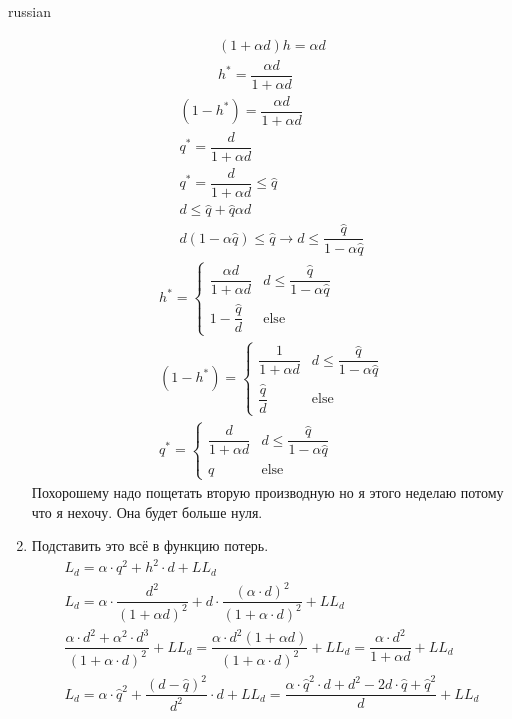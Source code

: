 \documentclass{article}
\begin{document}
\begin{otherlanguage*}{russian}
\begin{enumerate}
\begin{align*}
(1 + \alpha d) h = \alpha d \\
h^* = \dfrac{\alpha d}{1 + \alpha d}
\end{align*}
\begin{align*}
(1 - h^*) = \dfrac{\alpha d}{1 + \alpha d} \\
q^* = \dfrac{d}{1 + \alpha d } \\
q^* = \dfrac{d}{1 + \alpha d} \le \hat q \\
d \le \hat q + \hat q \alpha d \\
d (1 - \alpha \hat q) \le \hat q \rightarrow  d \le \dfrac{\hat q }{1 - \alpha \hat q }
\end{align*}
\begin{align*}
h^* = \begin{cases} 
\dfrac{\alpha d}{1 + \alpha d} & d \le \dfrac{\hat q }{1 - \alpha \hat q} \\ 
1 - \dfrac{\hat q}{d}& \text{else} 
\end{cases}  \\
(1 - h^*) = \begin{cases}
\dfrac{1 }{1 + \alpha d} & d \le \dfrac{\hat q }{1 - \alpha \hat q} \\
\dfrac{ \hat q }{d}& \text{else}
\end{cases} \\
q^* = \begin{cases}
\dfrac{d}{1 + \alpha d } & d \le \dfrac{\hat q }{1 - \alpha \hat q} \\
\hat q & \text{else} 
\end{cases}
\end{align*}
Похорошему надо пощетать вторую производную но я этого неделаю потому что я нехочу. Она будет больше нуля. 
\item Подставить это всё в функцию потерь. 
\begin{align*}
L_d = \alpha \cdot q^2 + h ^2 \cdot d + LL_d \\
L_d = \alpha \cdot \dfrac{d^2}{(1 + \alpha d)^2} + d \cdot \dfrac{(\alpha \cdot d)^2}{(1 + \alpha \cdot d)^2} + LL_d \\
\dfrac{\alpha \cdot d ^ 2 + \alpha ^ 2 \cdot d ^ 3}{(1 + \alpha \cdot d)^ 2} + LL_d = \dfrac{\alpha \cdot d ^2 (1 + \alpha d)}{(1 + \alpha \cdot d) ^ 2 } + LL_d = \dfrac{\alpha \cdot d ^2}{1 + \alpha d} + LL_d \\ 
L_d = \alpha \cdot \hat q ^ 2 + \dfrac{(d - \hat q)^ 2}{d^2} \cdot d + LL_d = \dfrac{\alpha \cdot \hat q ^2 \cdot d + d ^ 2 - 2 d \cdot \hat q + \hat q ^ 2 }{d}  + LL_d \\

\end{align*}
\end{enumerate}
\end{otherlanguage*}
\end{document}
